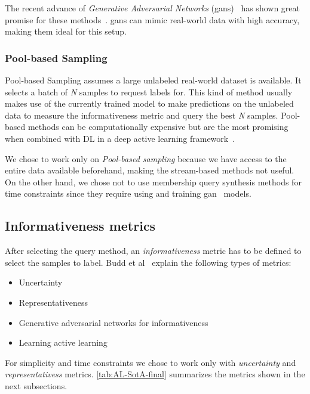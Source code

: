     The recent advance of \emph{Generative Adversarial Networks} (\acrshort{gan}s)~\cite{goodfellow2020generative} has shown great promise for these methods~\cite{budd2021survey}. \acrshort{gan}s can mimic real-world data with high accuracy, making them ideal for this setup.
    
    
    \subsubsection*{Pool-based Sampling}
    Pool-based Sampling assumes a large unlabeled real-world dataset is available. It selects a batch of \textit{N} samples to request labels for.
    This kind of method usually makes use of the currently trained model to make predictions on the unlabeled data to measure the informativeness metric and query the best \textit{N} samples.
    Pool-based methods can be computationally expensive but are the most promising when combined with DL in a deep active learning framework~\cite{budd2021survey}.
    
    
    We chose to work only on \emph{Pool-based sampling} because we have access to the entire data available beforehand, making the stream-based methods not useful.
    On the other hand, we chose not to use membership query synthesis methods for time constraints since they require using and training \acrfull{gan}~\cite{goodfellow2020generative} models.

    
    
    \subsection{Informativeness metrics}
    
    After selecting the query method, an \emph{informativeness} metric has to be defined to select the samples to label.
    Budd et al~\cite{budd2021survey} explain the following types of metrics:
    
    \begin{itemize}
        \item Uncertainty
        \item Representativeness
        \item Generative adversarial networks for informativeness
        \item Learning active learning
    \end{itemize}
    
    For simplicity and time constraints we chose to work only with \emph{uncertainty} and \emph{representativess} metrics. \autoref{tab:AL-SotA-final} summarizes the metrics shown in the next subsections.
    
